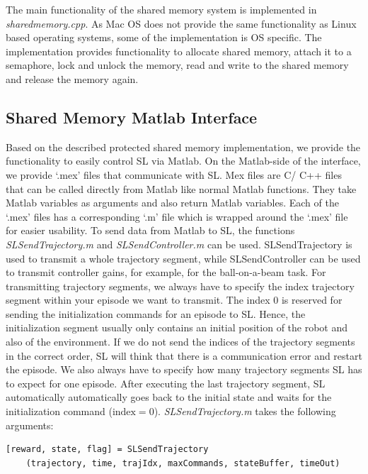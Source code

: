 \documentclass[11pt, article, colorback]{article}
\begin{document}
The main functionality of the shared memory system is implemented in {\em sharedmemory.cpp}. As Mac OS 
does not provide the same functionality as Linux based operating systems, some of the implementation is OS specific. 
The implementation provides functionality to allocate shared memory, attach it to a semaphore, lock and unlock the memory,
read and write to the shared memory and release the memory again.

\subsection{Shared Memory Matlab Interface}
Based on the described protected shared memory implementation, we provide the functionality to easily control SL via Matlab. 
On the Matlab-side of the interface, we provide `.mex' files that communicate with SL. Mex files are C/ C++ files that can 
be called directly from Matlab like normal Matlab functions. They take Matlab variables as arguments and also return Matlab 
variables. Each of the `.mex' files has a corresponding `.m' file which is wrapped around the `.mex' file for easier usability.  
To send data from Matlab to SL, the functions {\em SLSendTrajectory.m} and {\em SLSendController.m} can be used. SLSendTrajectory is used to transmit a whole trajectory segment, while
SLSendController can be used to transmit controller gains, for example, for the ball-on-a-beam task. 
For transmitting trajectory segments, we always have to specify the index trajectory segment within your episode we want to transmit. The index 
$0$ is reserved for sending the initialization commands for an episode to SL. Hence, the initialization segment usually only contains 
an initial position of the robot and also of the environment. If we do not send the indices of the trajectory segments in the correct order, SL
will think that there is a communication error and restart the episode. We also always have to  specify how many trajectory segments SL has to expect for one episode. After
executing the last trajectory segment, SL automatically automatically goes back to the initial state and waits for the initialization command ($\textrm{index} = 0$).
{\em SLSendTrajectory.m} takes the following arguments:
\begin{lstlisting}
[reward, state, flag] = SLSendTrajectory
	(trajectory, time, trajIdx, maxCommands, stateBuffer, timeOut)
\end{lstlisting}
%
\end{document}
